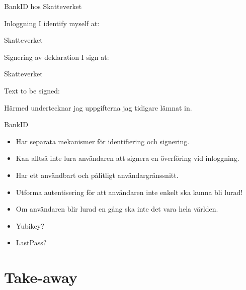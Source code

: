 \documentclass{beamer}
\begin{document}
\begin{frame}{BankID hos Skatteverket}
  \begin{block}{Inloggning}
    I identify myself at:
    
    Skatteverket
  \end{block}
  \begin{block}{Signering av deklaration}
    I sign at:

    Skatteverket

    \vspace{1em}
    Text to be signed:

    Härmed undertecknar jag uppgifterna jag tidigare lämnat in.
  \end{block}
\end{frame}

\begin{frame}{BankID}
  \begin{itemize}
    \item Har separata mekanismer för identifiering och signering.
    \item Kan alltså inte lura användaren att signera en överföring vid 
      inloggning.
    \item Har ett användbart och pålitligt användargränssnitt.
  \end{itemize}
\end{frame}

\begin{frame}
  \begin{itemize}
    \item Utforma autentisering för att användaren inte enkelt ska kunna bli 
      lurad!
    \item Om användaren blir lurad en gång ska inte det vara hela världen.
  \end{itemize}
\end{frame}


\begin{frame}
  \begin{itemize}
    \item Yubikey?
    \item LastPass?
  \end{itemize}
\end{frame}


\section{Take-away}
\end{document}
